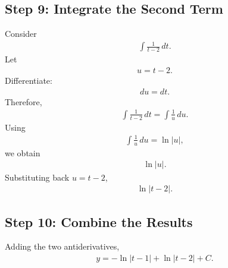 \documentclass[letterpaper,10pt,english]{sphinxmanual}
\begin{document}
\subsection{Step 9: Integrate the Second Term}
\label{\detokenize{Language/Science_language/ODE_calculus/course_MATH_3035/homework_assignments/index_pdf:step-9-integrate-the-second-term}}
\sphinxAtStartPar
Consider
\begin{equation*}
\begin{split}\int \frac{1}{t-2}\,dt.\end{split}
\end{equation*}
\sphinxAtStartPar
Let
\begin{equation*}
\begin{split}u=t-2.\end{split}
\end{equation*}
\sphinxAtStartPar
Differentiate:
\begin{equation*}
\begin{split}du=dt.\end{split}
\end{equation*}
\sphinxAtStartPar
Therefore,
\begin{equation*}
\begin{split}\int \frac{1}{t-2}\,dt
=
\int \frac{1}{u}\,du.\end{split}
\end{equation*}
\sphinxAtStartPar
Using
\begin{equation*}
\begin{split}\int \frac{1}{u}\,du=\ln|u|,\end{split}
\end{equation*}
\sphinxAtStartPar
we obtain
\begin{equation*}
\begin{split}\ln|u|.\end{split}
\end{equation*}
\sphinxAtStartPar
Substituting back \(u=t-2\),
\begin{equation*}
\begin{split}\ln|t-2|.\end{split}
\end{equation*}

\subsection{Step 10: Combine the Results}
\label{\detokenize{Language/Science_language/ODE_calculus/course_MATH_3035/homework_assignments/index_pdf:step-10-combine-the-results}}
\sphinxAtStartPar
Adding the two antiderivatives,
\begin{equation*}
\begin{split}y
=
-\ln|t-1|
+
\ln|t-2|
+
C.\end{split}
\end{equation*}
\end{document}
